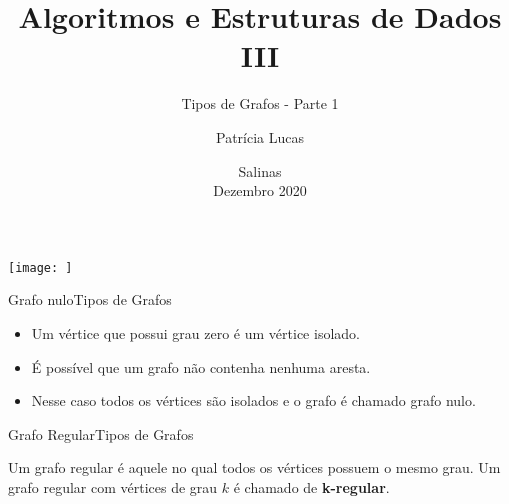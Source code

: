 \documentclass[t]{beamer}
\title[]{Algoritmos e Estruturas de Dados III}
\subtitle[]{Tipos de Grafos - Parte 1}
\author[]{Patrícia Lucas\\{\footnotesize }}
\institute{Bacharelado em Sistemas de Informação \\ IFNMG  - Campus Salinas}
\date{\scriptsize Salinas\\Dezembro 2020}
\begin{document}
\begin{frame}

\begin{center}
\texttt{[image: ]}
\end{center}
  \titlepage
\end{frame}

\begin{ftst}{Grafo nulo}{Tipos de Grafos}

\begin{itemize}
    \item Um vértice que possui grau zero é um vértice isolado.
    \item É possível que um grafo não contenha nenhuma aresta. 
    \item Nesse caso todos os vértices são isolados e o grafo é chamado grafo nulo.
\end{itemize}
\vone
\centering


\end{ftst}


\begin{ftst}{Grafo Regular}{Tipos de Grafos}

Um grafo regular é aquele no qual todos os vértices possuem o mesmo grau. Um grafo regular com vértices de grau $k$ é chamado de \textbf{k-regular}.

\vone

\centering 

\end{ftst}

\end{document}
